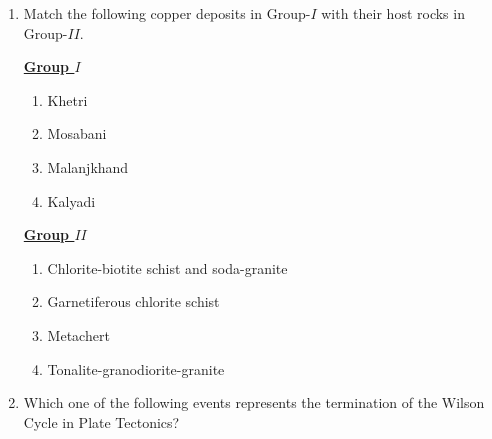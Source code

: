 \documentclass[journal,12pt,onecolumn]{IEEEtran}
\theoremstyle{remark}
\begin{document}
\begin{enumerate}
\item Match the following copper deposits in Group-$I$ with their host rocks in Group-$II$.
\begin{multicols}{2}
            \underline{\textbf{Group $I$}}
            \begin{enumerate}[start =16]
                \item Khetri
                \item Mosabani
                \item Malanjkhand
                \item Kalyadi
            \end{enumerate}

            \columnbreak

            \underline{\textbf{Group $II$}}
            \begin{enumerate}
                \item Chlorite-biotite schist and soda-granite
                \item Garnetiferous chlorite schist
                \item Metachert
                \item Tonalite-granodiorite-granite
            \end{enumerate}
        \end{multicols}
\begin{enumerate}
\end{enumerate}
\hfill{}

\item Which one of the following events represents the termination of the Wilson Cycle in Plate Tectonics?
\begin{enumerate}
\end{enumerate}
\hfill{}


\end{enumerate}
\end{document}
